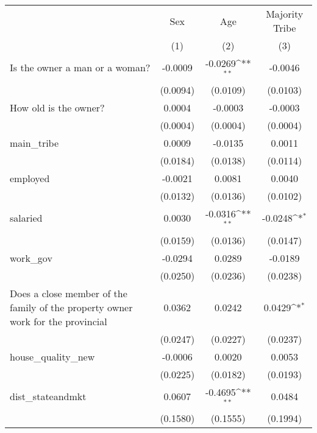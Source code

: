 {
\def\sym#1{\ifmmode^{#1}\else\(^{#1}\)\fi}
\begin{tabular}{l*{3}{c}}
\hline\hline
                &\multicolumn{1}{c}{Sex}&\multicolumn{1}{c}{Age}&\multicolumn{1}{c}{Majority Tribe}\\
                &\multicolumn{1}{c}{(1)}         &\multicolumn{1}{c}{(2)}         &\multicolumn{1}{c}{(3)}         \\
\hline
Is the owner a man or a woman? &  -0.0009         &  -0.0269\sym{**} &  -0.0046         \\
                & (0.0094)         & (0.0109)         & (0.0103)         \\
How old is the owner?&   0.0004         &  -0.0003         &  -0.0003         \\
                & (0.0004)         & (0.0004)         & (0.0004)         \\
main\_tribe      &   0.0009         &  -0.0135         &   0.0011         \\
                & (0.0184)         & (0.0138)         & (0.0114)         \\
employed        &  -0.0021         &   0.0081         &   0.0040         \\
                & (0.0132)         & (0.0136)         & (0.0102)         \\
salaried        &   0.0030         &  -0.0316\sym{**} &  -0.0248\sym{*}  \\
                & (0.0159)         & (0.0136)         & (0.0147)         \\
work\_gov        &  -0.0294         &   0.0289         &  -0.0189         \\
                & (0.0250)         & (0.0236)         & (0.0238)         \\
Does a close member of the family of the property owner work for the provincial &   0.0362         &   0.0242         &   0.0429\sym{*}  \\
                & (0.0247)         & (0.0227)         & (0.0237)         \\
house\_quality\_new&  -0.0006         &   0.0020         &   0.0053         \\
                & (0.0225)         & (0.0182)         & (0.0193)         \\
dist\_stateandmkt&   0.0607         &  -0.4695\sym{**} &   0.0484         \\
                & (0.1580)         & (0.1555)         & (0.1994)         \\

\end{tabular}}
